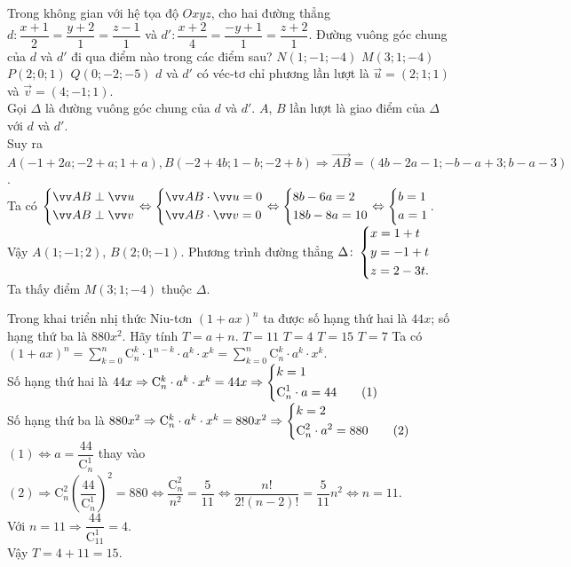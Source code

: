 \begin{ex}%
 Trong không gian với hệ tọa độ $Oxyz$, cho hai đường thẳng $d \colon \dfrac{x+1}{2}=\dfrac{y+2}{1}=\dfrac{z-1}{1}$ và $d' \colon \dfrac{x+2}{4}=\dfrac{-y+1}{1}=\dfrac{z+2}{1}$. Đường vuông góc chung của $d$ và $d'$ đi qua điểm nào trong các điểm sau?
 \choice
  {$N(1;-1;-4) $}
  {\True $M(3;1;-4)$}
  {$P(2;0;1)$}
  {$Q(0;-2;-5)$}
 \loigiai
  {
  $d$ và $d'$ có véc-tơ chỉ phương lần lượt là $\overrightarrow{u}=(2;1;1)$ và $\overrightarrow{v}=(4;-1;1)$. \\
  Gọi $\Delta $ là đường vuông góc chung của $d$ và $d'$. $A$, $B$ lần lượt là giao điểm của $\Delta $ với $d$ và $d'$.\\
  Suy ra $A(-1+2a;-2+a;1+a), B(-2+4b; 1-b;-2+b) \Rightarrow \overrightarrow{AB}=(4b-2a-1;-b-a+3;b-a-3)$.\\
  Ta có $\heva{& \overrightarrow{AB} \perp \overrightarrow{u}\\ & \overrightarrow{AB} \perp \overrightarrow{v}} \Leftrightarrow \heva{& \overrightarrow{AB} \cdot \overrightarrow{u}=0\\ & \overrightarrow{AB} \cdot \overrightarrow{v}=0} \Leftrightarrow \heva{&8b-6a=2\\&18b-8a=10} \Leftrightarrow \heva{&b=1\\&a=1}$.\\
  Vậy $A(1;-1;2)$, $B(2;0;-1)$.
  Phương trình đường thẳng $\Delta \colon \left\{\begin{aligned}&x=1+t\\&y=-1+t\\&z=2-3t.\end{aligned}\right.$\\
  Ta thấy điểm $M(3;1;-4)$ thuộc $\Delta$.
  }
\end{ex}


\begin{ex}%
 Trong khai triển nhị thức Niu-tơn $(1+ax)^n$ ta được số hạng thứ hai là $44x$; số hạng thứ ba là $880x^2$. Hãy tính $T=a+n$.
 \choice
  {$T=11$}
  {$T=4$}
  {\True $T=15$}
  {$T=7$}
 \loigiai
  {
  Ta có $\left( 1+ax\right)^n= \sum \limits_{k=0}^n \mathrm{C}_n^k \cdot 1^{n-k} \cdot a^k \cdot x^k = \sum \limits_{k=0}^n \mathrm{C}_n^k \cdot a^k \cdot x^k$.\\
  Số hạng thứ hai là $44x \Rightarrow  \mathrm{C}_n^k \cdot a^k \cdot x^k = 44x \Rightarrow \left\{\begin{aligned}& k=1\\ & \mathrm{C}_n^1 \cdot a = 44 \quad \quad (1)\end{aligned}\right. $\\
  Số hạng thứ ba là $880x^2 \Rightarrow \mathrm{C}_n^k \cdot a^k \cdot x^k = 880x^2 \Rightarrow \left\{\begin{aligned}&k=2\\& \mathrm{C}_n^2 \cdot a^2 = 880 \quad \quad (2) \end{aligned}\right.$\\
  $(1) \Leftrightarrow a = \dfrac{44}{\mathrm{C}_n^1}$ thay vào $(2) \Rightarrow \mathrm{C}_n^2 \left( \dfrac{44}{\mathrm{C}_n^1} \right)^2 =880\Leftrightarrow \dfrac{\mathrm{C}_n^2}{n^2}=\dfrac{5}{11} \Leftrightarrow \dfrac{n!}{2!(n-2)!}=\dfrac{5}{11}n^2 \Leftrightarrow n =11$.\\
  Với $n=11\Rightarrow \dfrac{44}{\mathrm{C}_{11}^1}=4$.\\
  Vậy $T = 4 + 11 = 15$.
  }
\end{ex}


